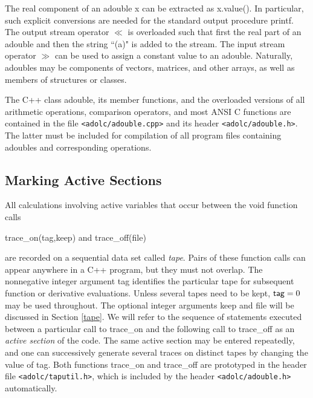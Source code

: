 \documentclass[11pt,twoside]{article}
\begin{document}
The real component of an {\sf adouble x} can be extracted as
{\sf x.value()}. In particular,
such explicit conversions are needed for the standard output procedure
{\sf printf}. The output stream operator \boldmath $\ll$ \unboldmath is overloaded such
that first the real part of an {\sf adouble} and then the string
``{\sf (a)}" is added to the stream. The input stream operator \boldmath $\gg$ \unboldmath  can
be used to assign a constant value to an {\sf adouble}.
Naturally, {\sf adouble}s may be
components of vectors, matrices, and other arrays, as well as
members of structures or classes. 

The C++ class {\sf adouble}, its member functions, and the overloaded
versions of all arithmetic operations, comparison operators, and 
most ANSI C functions are contained in the file \verb=<adolc/adouble.cpp>= and its
header \verb=<adolc/adouble.h>=. The latter must be included for compilation
of all program files containing {\sf adouble}s and corresponding 
operations. 
%
\subsection{Marking Active Sections}
\label{markingActive}
%
All calculations involving active variables that occur between
the void function calls
\begin{center}
{\sf trace\_on(tag,keep)} \hspace{0.3in} and \hspace{0.3in}
{\sf trace\_off(file)}
\end{center}
are recorded on a sequential data set called {\em tape}. Pairs of
these function calls can appear anywhere in a C++ program, but
they must not overlap. The nonnegative integer argument {\sf tag} identifies the
particular tape for subsequent function or derivative evaluations.
Unless several tapes need to be kept, ${\sf tag} =0$ may be used throughout.
The optional integer arguments {\sf keep} and
{\sf file} will be discussed in Section \ref{tape}. We will refer to the
sequence of statements executed between a particular call to
{\sf trace\_on} and the following call to {\sf trace\_off} as an
{\em active section} of the code. The same active section may be
entered repeatedly, and one can successively generate several traces
on distinct tapes by changing the value of {\sf tag}. 
Both functions {\sf trace\_on} and {\sf trace\_off} are prototyped in
the header file \verb=<adolc/taputil.h>=, which is included by the header
\verb=<adolc/adouble.h>= automatically.
\end{document}
